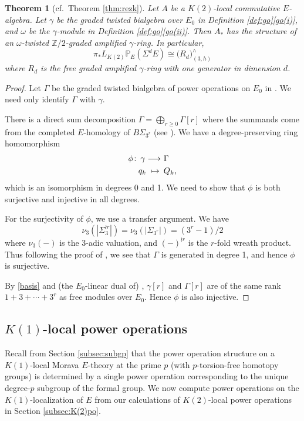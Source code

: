 \documentclass{gtpart}
\newtheorem{thm}{Theorem}
\theoremstyle{definition}
\theoremstyle{remark}
\def\co{\colon\thinspace}
\newcommand{\mb}[1]{\mathbb{#1}}
\newcommand{\BP}{{\mb P}}
\newcommand{\BZ}{{\mb Z}}
\newcommand{\G}{\Gamma}
\newcommand{\g}{\gamma}
\newcommand{\go}[1]{Definition \ref{def:go}\thinspace \eqref{go(#1)}}
\numberwithin{equation}{section}
\numberwithin{thm}{section}
\begin{document}
\begin{thm}[cf.~Theorem \ref{thm:rezk}]
\label{thm:gamma}
 Let $A$ be a $K(2)$-local commutative $E$-algebra.  Let $\g$ be the 
 graded twisted bialgebra over $E_0$ in \go{i}, and $\omega$ be the 
 $\g$-module in \go{ii}.  Then $A_*$ has the structure of an 
 $\omega$-twisted $\BZ/2$-graded amplified $\g$-ring.  In particular, 
 \[
  \pi_* L_{K(2)} \BP_E (\Sigma^d E) \cong \big( R_d \big)_{(3,h)}^\wedge 
 \]
 where $R_d$ is the free graded amplified $\g$-ring with one generator 
 in dimension $d$.  
\end{thm}
\begin{proof}
 Let $\G$ be the graded twisted bialgebra of power operations on $E_0$ 
 in \cite[Section 6]{cong}.  We need only identify $\G$ with $\g$.  

 There is a direct sum decomposition $\G = \bigoplus_{r \geq 0} \G[r]$ 
 where the summands come from the completed $E$-homology of 
 $B\Sigma_{3^r}$ (see \cite[6.2]{cong}).  We have a degree-preserving 
 ring homomorphism 
 \begin{equation*}
 \begin{split}
  \phi \co \g \longrightarrow & ~ \G \\
  q_k ~ \mapsto \thinspace & ~ Q_k, 
 \end{split}
 \end{equation*}
 which is an isomorphism in degrees 0 and 1.  We need to show that 
 $\phi$ is both surjective and injective in all degrees.  

 For the surjectivity of $\phi$, we use a transfer argument.  We have 
 \[
  \nu_3(|\Sigma_3^{\wr r}|) = \nu_3(|\Sigma_{3^r}|) = (3^r - 1) / 2 
 \]
 where $\nu_3(-)$ is the 3-adic valuation, and $(-)^{\wr r}$ is the 
 $r$-fold wreath product.  Thus following the proof of 
 \cite[Proposition 3.17]{cong}, we see that $\G$ is generated in degree 
 1, and hence $\phi$ is surjective.  

 By \eqref{basis} and (the $E_0$-linear dual of) 
 \cite[Theorem 1.1]{Str98}, $\g[r]$ and $\G[r]$ are of the same rank 
 $1 + 3 + \cdots + 3^r$ as free modules over $E_0$.  Hence $\phi$ is 
 also injective.  
\end{proof}


\subsection{$K(1)$-local power operations}
\label{subsec:K(1)po}

Recall from Section \ref{subsec:subgp} that the power operation 
structure on a $K(1)$-local Morava $E$-theory at the prime $p$ (with 
$p$-torsion-free homotopy groups) is determined by a single power 
operation corresponding to the unique degree-$p$ subgroup of the formal 
group.  We now compute power operations on the $K(1)$-localization of 
$E$ from our calculations of $K(2)$-local power operations in Section 
\ref{subsec:K(2)po}.  
\end{document}
